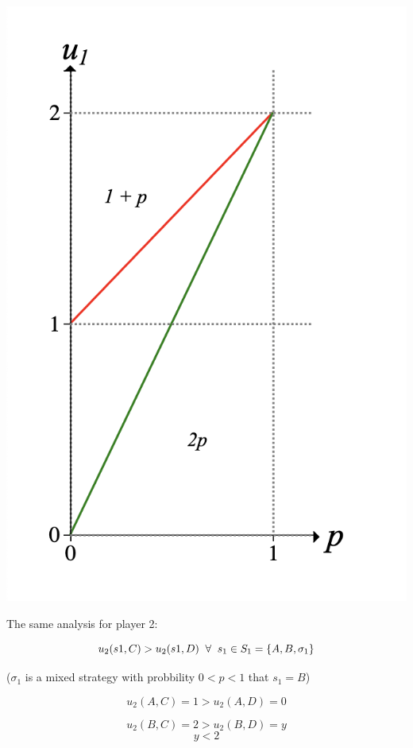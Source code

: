 \documentclass[a4paper,11pt]{article}
\begin{document}
\begin{center}
  \includegraphics[scale=0.5]{prob_2_1_fig1.png}
\end{center}

The same analysis for player 2:

\[ u_2(s1, C) > u_2(s1, D) \hspace{2mm} \forall \hspace{2mm} s_1 \in S_1 = \{ A, B, \sigma_1 \} \]

\begin{center}
($\sigma_1$ is a mixed strategy with probbility $0 < p < 1$ that $s_1 = B$)
\end{center}
\[ u_2(A, C) = 1 > u_2(A, D) = 0 \]

\[ u_2(B, C) = 2 > u_2(B, D) = y \]
\[ y < 2 \]
\end{document}
